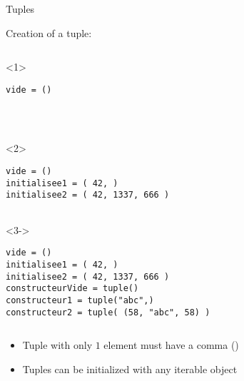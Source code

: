 \begin{frame}[fragile]{Tuples}

  \begin{center}

  Creation of a tuple:

  \medskip

  \begin{columns}[onlytextwidth]
    \begin{column}{\textwidth}

      \begin{onlyenv}<1>
        \begin{lstlisting}[style=python,morekeywords={for, in, range, list}]
vide = ()




 \end{lstlisting}
      \end{onlyenv}

      \begin{onlyenv}<2>
        \begin{lstlisting}[style=python,morekeywords={for, in, range, list}]
vide = ()
initialisee1 = ( 42, )
initialisee2 = ( 42, 1337, 666 )


 \end{lstlisting}
      \end{onlyenv}

      \begin{onlyenv}<3->
        \begin{lstlisting}[style=python,morekeywords={for, in, range, list}]
vide = ()
initialisee1 = ( 42, )
initialisee2 = ( 42, 1337, 666 )
constructeurVide = tuple()
constructeur1 = tuple("abc",)
constructeur2 = tuple( (58, "abc", 58) ) \end{lstlisting}
      \end{onlyenv}

    \end{column}
  \end{columns}

  \medskip

  \begin{itemize}
    \item<4-> Tuple with only $ 1 $ element must have a comma (\TTBF{,})
    \item<5-> Tuples can be initialized with any iterable object
  \end{itemize}

  \end{center}

\end{frame}



